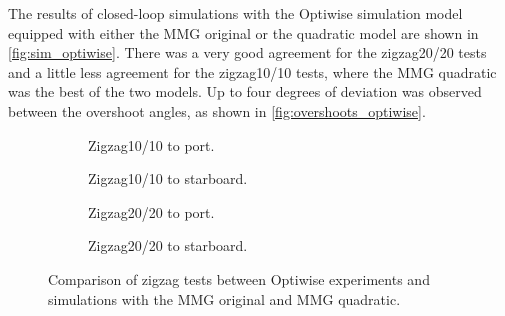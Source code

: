 The results of closed-loop simulations with the Optiwise simulation model equipped with either the MMG original or the quadratic model are shown in \autoref{fig:sim_optiwise}. There was a very good agreement for the zigzag20/20 tests and a little less agreement for the zigzag10/10 tests, where the MMG quadratic was the best of the two models. Up to four degrees of deviation was observed between the overshoot angles, as shown in \autoref{fig:overshoots_optiwise}.   
\begin{figure}[h]
     \centering
     \begin{subfigure}[b]{0.40\textwidth}
         \centering
         
        \caption{Zigzag10/10 to port.}
        \label{fig:sim_optiwise_10_port}
     \end{subfigure}
     \hfill
     \begin{subfigure}[b]{0.40\textwidth}
         
        \caption{Zigzag10/10 to starboard.}
        \label{fig:sim_optiwise_10_stbd}
     \end{subfigure}
     \vfill
     \begin{subfigure}[b]{0.40\textwidth}
         \centering
         
        \caption{Zigzag20/20 to port.}
        \label{fig:sim_optiwise_20_port}
     \end{subfigure}
     \hfill
     \begin{subfigure}[b]{0.40\textwidth}
         
        \caption{Zigzag20/20 to starboard.}
        \label{fig:sim_optiwise_20_stbd}
     \end{subfigure}
     
        \caption{Comparison of zigzag tests between Optiwise experiments and simulations with the MMG original and MMG quadratic.}
        \label{fig:sim_optiwise}
\end{figure}
\vspace{-1cm}

